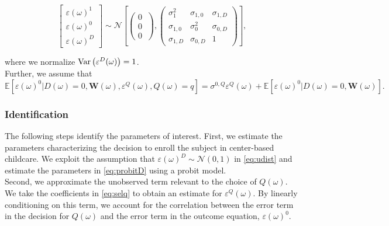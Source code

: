 \begin{appendices}
\begin{equation}
        \left[ \begin{array}{l}
        	 \varepsilon(\omega)^1 \\
            \varepsilon(\omega)^0 \\
            \varepsilon(\omega)^D
        \end{array} \right]  \sim \mathcal{N} \left[ \left( \begin{array}{l}
        	 0 \\
           0 \\
           0
        \end{array} \ \right),
                \left( \begin{array}{llll}
        	 \sigma_{1}^2 & \sigma_{1,0} & \sigma_{1,D}   \\
             \sigma_{1,0} & \sigma_{0}^2 & \sigma_{0,D}   \\
             \sigma_{1,D} & \sigma_{0,D} & 1
        \end{array} \right) \right],  \label{eq:udist}
\end{equation}

\noindent where we normalize $\operatorname{Var} \left( \varepsilon^D(\omega) \right) =1$.\\

\noindent Further, we assume that
\begin{equation}
\mathbb{E}\left[\varepsilon(\omega)^0|D(\omega)=0,\mathbf{W}(\omega),\varepsilon^{Q}(\omega),Q(\omega)=q\right]=\sigma^{0,Q}\varepsilon^{Q}(\omega)+\mathbb{E}\left[\varepsilon(\omega)^0|D(\omega)=0,\mathbf{W}(\omega)\right].
\label{eq:E[epsilon0]}
\end{equation}

\subsubsection{Identification}

\noindent The following steps identify the parameters of interest. First, we estimate the parameters characterizing the decision to enroll the subject in center-based childcare. We exploit the assumption that $\varepsilon(\omega)^D \sim \mathcal{N} \left( 0, 1 \right)$ in \eqref{eq:udist} and estimate the parameters in \eqref{eq:probitD} using a probit model.\\

\noindent Second, we approximate the unobserved term relevant to the choice of $Q(\omega)$. We take the coefficients in \eqref{eq:selq} to obtain an estimate for $\varepsilon^{Q}(\omega)$. By linearly conditioning on this term, we account for the correlation between the error term in the decision for $Q(\omega)$ and the error term in the outcome equation, $\varepsilon(\omega)^0$.\\


\end{appendices}

